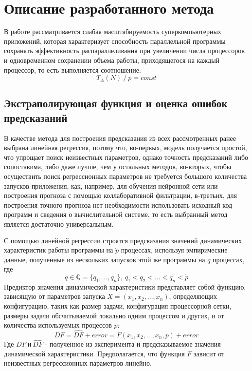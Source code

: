 \section{Описание разработанного метода}
	В работе рассматривается слабая масштабируемость суперкомпьютерных приложений, которая характеризует способность параллельной программы сохранять эффективность распараллеливания при увеличении числа процессоров и одновременном сохранении объема работы, приходящегося на каждый процессор, то есть выполняется соотношение:
	\begin{equation}\label{weak_sc}
	T_A(N)\:/\:p = const
	\end{equation}

	\subsection{Экстраполирующая функция и оценка ошибок предсказаний}
		В качестве метода для построения предсказания из всех рассмотренных ранее выбрана линейная регрессия, потому что, во-первых, модель получается простой, что упрощает поиск неизвестных параметров, однако точность предсказаний либо сопоставима, либо даже лучше, чем у остальных методов, во-вторых, чтобы осуществить поиск регрессионных параметров не требуется большого количества запусков приложения, как, например, для обучения нейронной сети или построения прогноза с помощью коллаборативной фильтрации, в-третьих, для построения точного прогноза нет необходимости использовать исходный код программ и сведения о вычислительной системе, то есть выбранный метод является достаточно универсальным.%

		С помощью линейной регрессии строятся предсказания значений динамических характеристик работы программы на \(\dot{p}\) процессах, используя эмпирические данные, полученные из нескольких запусков этой же программы на \(q\) процессах, где
		\[
		q \in \mathbb{Q} = \{q_1,\ldots, q_n\},\ q_1 < q_2 < \ldots < q_n < \dot{p}
		\]
		Предиктор значения динамической характеристики представляет собой функцию, зависящую от параметров запуска \(X = (x_1, x_2, \ldots, x_n)\), определяющих конфигурацию, таких как размер задачи, конфигурация процессорной сетки, размеры задачи обсчитываемой локально одним процессом и других, и от количества используемых процессов \(p\):
		\begin{equation}\label{main_formula}
		DF = \hat{DF} + error = F(x_1, x_2, \ldots, x_n, p) + error
		\end{equation}
		Где \(DF\ и\ \hat{DF}\) - полученное из эксперимента и предсказываемое значения динамической характеристики. Предполагается, что функция \(F\) зависит от неизвестных регрессионных параметров линейно.

